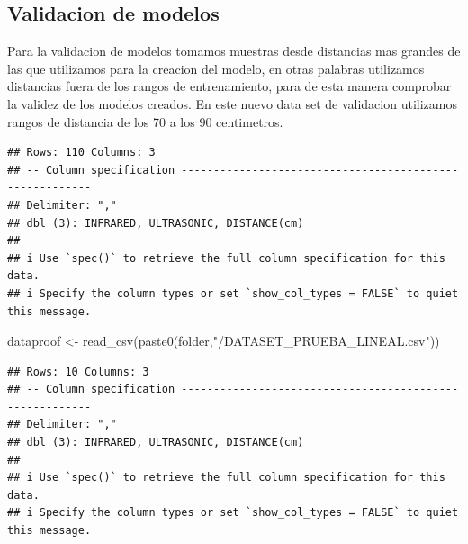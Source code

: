 \documentclass[
]{article}
\newenvironment{Shaded}{\begin{snugshade}}{\end{snugshade}}
\newcommand{\FunctionTok}[1]{\textcolor[rgb]{0.00,0.00,0.00}{#1}}
\newcommand{\NormalTok}[1]{#1}
\newcommand{\OtherTok}[1]{\textcolor[rgb]{0.56,0.35,0.01}{#1}}
\newcommand{\SpecialCharTok}[1]{\textcolor[rgb]{0.00,0.00,0.00}{#1}}
\newcommand{\StringTok}[1]{\textcolor[rgb]{0.31,0.60,0.02}{#1}}
\begin{document}
\hypertarget{validacion-de-modelos}{%
\subsection{Validacion de modelos}\label{validacion-de-modelos}}

Para la validacion de modelos tomamos muestras desde distancias mas
grandes de las que utilizamos para la creacion del modelo, en otras
palabras utilizamos distancias fuera de los rangos de entrenamiento,
para de esta manera comprobar la validez de los modelos creados. En este
nuevo data set de validacion utilizamos rangos de distancia de los 70 a
los 90 centimetros.

\begin{Shaded}
\end{Shaded}

\begin{verbatim}
## Rows: 110 Columns: 3
## -- Column specification --------------------------------------------------------
## Delimiter: ","
## dbl (3): INFRARED, ULTRASONIC, DISTANCE(cm)
## 
## i Use `spec()` to retrieve the full column specification for this data.
## i Specify the column types or set `show_col_types = FALSE` to quiet this message.
\end{verbatim}

\begin{Shaded}
\begin{Highlighting}[]
\NormalTok{dataproof }\OtherTok{\textless{}{-}} \FunctionTok{read\_csv}\NormalTok{(}\FunctionTok{paste0}\NormalTok{(folder,}\StringTok{"/DATASET\_PRUEBA\_LINEAL.csv"}\NormalTok{))}
\end{Highlighting}
\end{Shaded}

\begin{verbatim}
## Rows: 10 Columns: 3
## -- Column specification --------------------------------------------------------
## Delimiter: ","
## dbl (3): INFRARED, ULTRASONIC, DISTANCE(cm)
## 
## i Use `spec()` to retrieve the full column specification for this data.
## i Specify the column types or set `show_col_types = FALSE` to quiet this message.
\end{verbatim}
\end{document}
